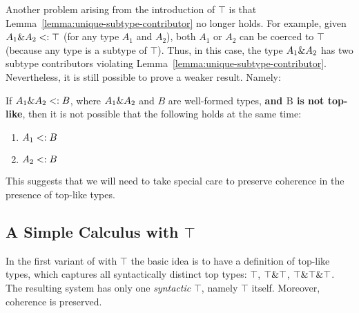 Another problem arising from the introduction of $\top$ is that Lemma~\ref{lemma:unique-subtype-contributor}
no longer holds. For example, given $A_1 \& A_2 <: \top$ (for
any type $A_1$ and $A_2$), both $A_1$ or $A_2$ can be coerced to
$\top$ (because any type is a subtype of $\top$).
Thus, in this case, the type ${A_1} \& {A_2}$ has two subtype
contributors violating
Lemma~\ref{lemma:unique-subtype-contributor}. Nevertheless,
it is still possible to prove a weaker result.
Namely:

\begin{lemma}
  \label{lemma:unique-subtype-contributor-with-top}

  If $A_1 \& A_2 <: B$, where $A_1 \& A_2$ and $B$ are well-formed types,
  \textbf{and $\text{B}$ is not top-like},
  then it is not possible that the following holds at the same time:
  \begin{enumerate}
    \item $A_1 <: B$
    \item $A_2 <: B$
  \end{enumerate}
\end{lemma}

This suggests that we will need to take special care to preserve
coherence in the presence of top-like types.

\subsection{A Simple Calculus with $\top$}\label{subsec:simpletop}

In the first variant of \name with $\top$ the basic idea is to have a 
definition of top-like types, which captures all syntactically
distinct top types:  $\top$, $\top \& \top$, $\top \& \top
\& \top$. The resulting system has only one \emph{syntactic}
$\top$, namely $\top$ itself. Moreover, coherence is preserved.

